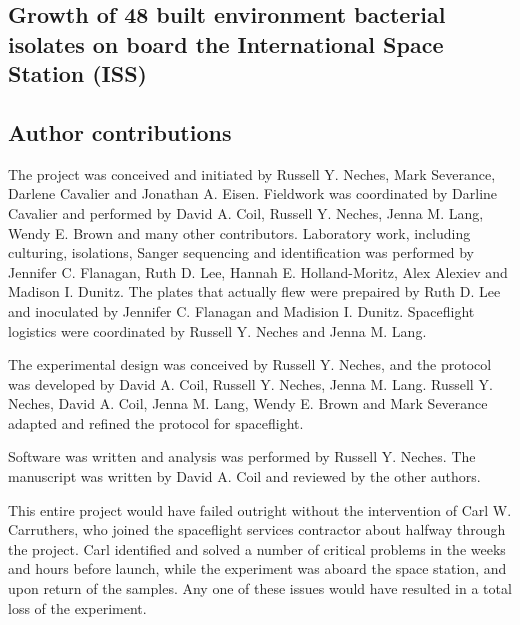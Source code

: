 \begin{refsection}

\chapter{Growth of 48 built environment bacterial isolates on board the International Space Station (ISS)}


\section{Author contributions}

The project was conceived and initiated by Russell Y. Neches, Mark
Severance, Darlene Cavalier and Jonathan A. Eisen. Fieldwork was
coordinated by Darline Cavalier and performed by David A. Coil,
Russell Y. Neches, Jenna M. Lang, Wendy E. Brown and many other
contributors. Laboratory work, including culturing, isolations, Sanger 
sequencing and identification was performed by Jennifer C. Flanagan,
Ruth D. Lee, Hannah E. Holland-Moritz, Alex Alexiev and Madison I.
Dunitz. The plates that actually flew were prepaired by Ruth D. Lee
and inoculated by Jennifer C. Flanagan and Madision I. Dunitz. 
Spaceflight logistics were coordinated by Russell Y. Neches and Jenna
M. Lang.

The experimental design was conceived by Russell Y. Neches, and the
protocol was developed by David A. Coil, Russell Y. Neches, Jenna M.
Lang. Russell Y. Neches, David A. Coil, Jenna M. Lang, Wendy E. Brown
and Mark Severance adapted and refined the protocol for spaceflight.

Software was written and analysis was performed by Russell Y. Neches.
The manuscript was written by David A. Coil and reviewed by the
other authors.

This entire project would have failed outright without the
intervention of Carl W. Carruthers, who joined the spaceflight
services contractor about halfway through the project. Carl identified
and solved a number of critical problems in the weeks and hours before
launch, while the experiment was aboard the space station, and upon
return of the samples. Any one of these issues would have resulted in
a total loss of the experiment.







\printbibliography[heading=subbibliography]

\end{refsection}
